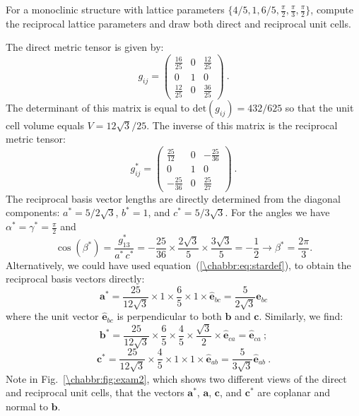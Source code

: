 \begin{example}\label{\chabbr:ex:exam2}
For a monoclinic structure with lattice parameters $\{4/5,1,6/5,\frac{\pi}{2},\frac{\pi}{3},\frac{\pi}{2}\}$, compute the reciprocal lattice parameters and draw both direct and reciprocal unit cells.  

The direct metric tensor is given by:
\[
	g_{ij} = \begin{pmatrix}\frac{16}{25} & 0 & \frac{12}{25}\\ 0 & 1 & 0\\ \frac{12}{25} & 0 & \frac{36}{25}\end{pmatrix}\ .
\]
The determinant of this matrix is equal to $\text{det}(g_{ij}) = 432/625$ so that the unit cell volume equals $V = 12\sqrt{3}/25$. The inverse of this matrix is the reciprocal metric tensor:
\[
	g^{\ast}_{ij} = \begin{pmatrix}\frac{25}{12} & 0 & -\frac{25}{36}\\ 0 & 1 & 0\\ -\frac{25}{36} & 0 & \frac{25}{27}\end{pmatrix}\ .
\]
The reciprocal basis vector lengths are directly determined from the diagonal components: $a^{\ast}=5/2\sqrt{3}$, $b^{\ast}=1$, and $c^{\ast}=5/3\sqrt{3}$.  For the angles we have $\alpha^{\ast}=\gamma^{\ast}=\frac{\pi}{2}$ and 
\[
	\cos(\beta^{\ast}) = \frac{g^{\ast}_{13}}{a^{\ast}\,c^{\ast}} = -\frac{25}{36}\times \frac{2\sqrt{3}}{5}\times\frac{3\sqrt{3}}{5} = -\frac{1}{2}\longrightarrow \beta^{\ast} = \frac{2\pi}{3}.
\]
Alternatively, we could have used equation~(\ref{\chabbr:eq:stardef}), to obtain the reciprocal basis vectors directly:
\[
	\mathbf{a}^{\ast}=\frac{25}{12\sqrt{3}}\times 1\times \frac{6}{5}\times1\times\hat{\mathbf{e}}_{bc} = \frac{5}{2\sqrt{3}}\hat{\mathbf{e}}_{bc}
\]
where the unit vector $\hat{\mathbf{e}}_{bc}$ is perpendicular to both $\mathbf{b}$ and $\mathbf{c}$.  Similarly, we find:
\[
	\mathbf{b}^{\ast}=\frac{25}{12\sqrt{3}}\times \frac{6}{5}\times \frac{4}{5}\times  \frac{\sqrt{3}}{2}\times\hat{\mathbf{e}}_{ca} = \hat{\mathbf{e}}_{ca}\ ;
\]
\[
	\mathbf{c}^{\ast}=\frac{25}{12\sqrt{3}}\times \frac{4}{5}\times 1\times 1\times\hat{\mathbf{e}}_{ab} = \frac{5}{3\sqrt{3}} \hat{\mathbf{e}}_{ab}\ .
\]
Note in Fig.~\ref{\chabbr:fig:exam2}, which shows two different views of the direct and reciprocal unit cells, that the vectors $\mathbf{a}^{\ast}$, $\mathbf{a}$, $\mathbf{c}$, and $\mathbf{c}^{\ast}$ are coplanar and normal to $\mathbf{b}$.
\end{example}


